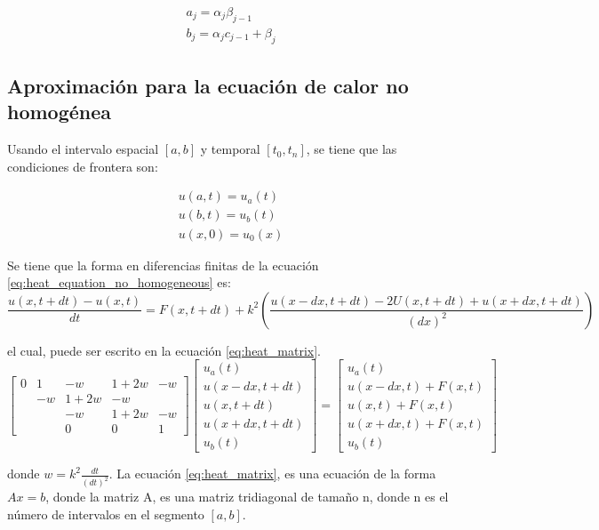 \begin{align}
    a_j = \alpha_j \beta_{j-1}  \label{eq:a_j} \\
    b_j = \alpha_j c_{j-1} + \beta_j \label{eq:b_j}
\end{align}

\subsection{Aproximación para la ecuación de calor no homogénea}

Usando el intervalo espacial $[a,b]$ y temporal $[t_0,t_n]$, se tiene que las condiciones de frontera son:

\begin{align}
    u(a,t) = u_a(t)  \nonumber \\
    u(b,t) = u_b(t)            \\
    u(x,0) = u_0(x) \nonumber
\end{align}

Se tiene que la forma en diferencias finitas de la ecuación \ref{eq:heat_equation_no_homogeneous} es:
\small
\begin{equation}
    \frac{u(x,t+dt) -u(x,t)}{dt} = F(x,t+dt) + k^2 \left (\frac{u(x-dx,t+dt)-2U(x,t+dt)+u(x+dx,t+dt)}{(dx)^2} \right )
\end{equation}
\normalsize

el cual, puede ser escrito en la ecuación \ref{eq:heat_matrix}.
\scriptsize
\begin{equation}
    \begin{bmatrix}
        0  & 1    &
        -w & 1+2w & -w               \\
           & -w   & 1+2w & -w        \\
           &      & -w   & 1+2w & -w \\
           &      & 0    & 0    & 1
    \end{bmatrix}
    \begin{bmatrix}
        u_a(t)       \\
        u(x-dx,t+dt) \\
        u(x,t+dt)    \\
        u(x+dx,t+dt) \\
        u_b(t)
    \end{bmatrix} = \begin{bmatrix}
        u_a(t)           \\
        u(x-dx,t)+F(x,t) \\
        u(x,t)+F(x,t)    \\
        u(x+dx,t)+F(x,t) \\
        u_b(t)
    \end{bmatrix} \label{eq:heat_matrix}
\end{equation}
\normalsize

donde $w=k^2\frac{dt}{(dt)^2}$. La ecuación \ref{eq:heat_matrix}, es una ecuación de la forma $Ax=b$, donde la matriz A, es una matriz tridiagonal de tamaño n, donde n es el número de intervalos en el segmento $[a,b]$.